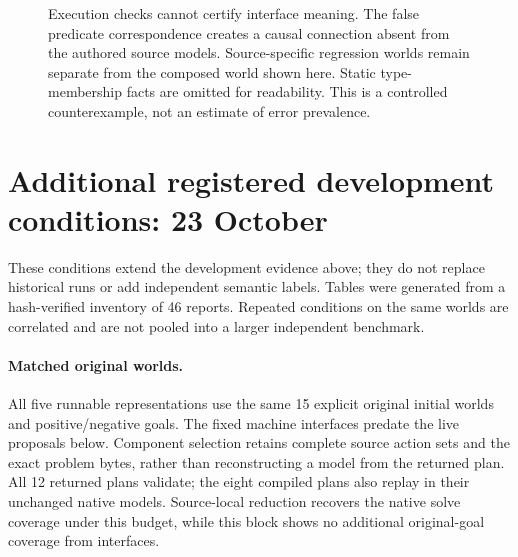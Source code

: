 \documentclass[letterpaper]{article}
\begin{document}
\begin{figure}[t]
\centering
{}
\caption{Execution checks cannot certify interface meaning. The false predicate correspondence creates a causal connection absent from the authored source models. Source-specific regression worlds remain separate from the composed world shown here. Static type-membership facts are omitted for readability. This is a controlled counterexample, not an estimate of error prevalence.}
\label{fig:semantic-negative}
\end{figure}

\section{Additional registered development conditions: 23 October}
These conditions extend the development evidence above; they do not replace historical runs or add independent semantic labels. Tables were generated from a hash-verified inventory of 46 reports. Repeated conditions on the same worlds are correlated and are not pooled into a larger independent benchmark.

\paragraph{Matched original worlds.}
All five runnable representations use the same 15 explicit original initial worlds and positive/negative goals. The fixed machine interfaces predate the live proposals below. Component selection retains complete source action sets and the exact problem bytes, rather than reconstructing a model from the returned plan. All 12 returned plans validate; the eight compiled plans also replay in their unchanged native models. Source-local reduction recovers the native solve coverage under this budget, while this block shows no additional original-goal coverage from interfaces.

\end{document}
